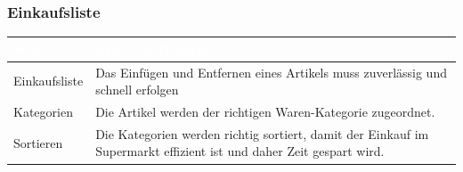 \documentclass[12pt]{article}
\theoremstyle{definition}
\begin{document}
\subsubsection{Einkaufsliste}
\begin{tabular}{|p{.3\linewidth}|p{.7\linewidth}|}
\hline
\cellcolor[gray]{0.5}\textcolor{white}{Steps} & \cellcolor[gray]{0.5}\textcolor{white}{Expected Behavior} \\ \hline
Einkaufsliste&Das Einfügen und Entfernen eines Artikels muss zuverlässig und schnell erfolgen \\ \hline
Kategorien& Die Artikel werden der richtigen Waren-Kategorie zugeordnet. \\ \hline
Sortieren & Die Kategorien werden richtig sortiert, damit der Einkauf im Supermarkt effizient ist und daher Zeit gespart wird.\\\hline
\end{tabular}



\pagebreak
\end{document}
